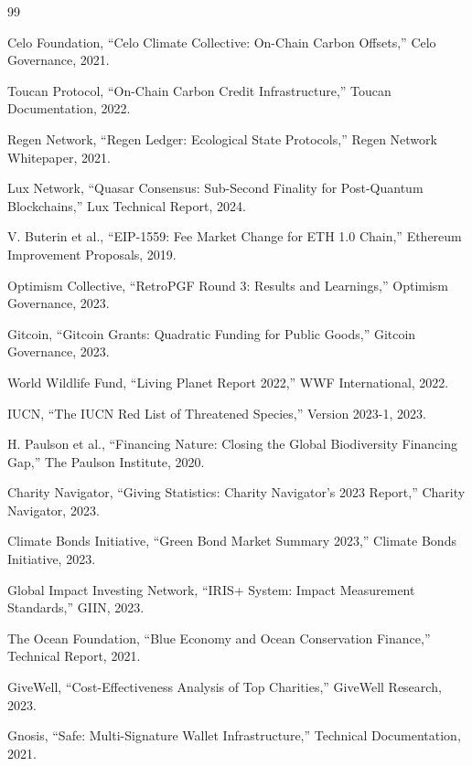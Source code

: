 \documentclass[11pt,letterpaper]{article}
\begin{document}

\begin{thebibliography}{99}

Celo Foundation, ``Celo Climate Collective: On-Chain Carbon Offsets,'' Celo Governance, 2021.

Toucan Protocol, ``On-Chain Carbon Credit Infrastructure,'' Toucan Documentation, 2022.

Regen Network, ``Regen Ledger: Ecological State Protocols,'' Regen Network Whitepaper, 2021.

Lux Network, ``Quasar Consensus: Sub-Second Finality for Post-Quantum Blockchains,'' Lux Technical Report, 2024.

V. Buterin et al., ``EIP-1559: Fee Market Change for ETH 1.0 Chain,'' Ethereum Improvement Proposals, 2019.

Optimism Collective, ``RetroPGF Round 3: Results and Learnings,'' Optimism Governance, 2023.

Gitcoin, ``Gitcoin Grants: Quadratic Funding for Public Goods,'' Gitcoin Governance, 2023.

World Wildlife Fund, ``Living Planet Report 2022,'' WWF International, 2022.

IUCN, ``The IUCN Red List of Threatened Species,'' Version 2023-1, 2023.

H. Paulson et al., ``Financing Nature: Closing the Global Biodiversity Financing Gap,'' The Paulson Institute, 2020.

Charity Navigator, ``Giving Statistics: Charity Navigator's 2023 Report,'' Charity Navigator, 2023.

Climate Bonds Initiative, ``Green Bond Market Summary 2023,'' Climate Bonds Initiative, 2023.

Global Impact Investing Network, ``IRIS+ System: Impact Measurement Standards,'' GIIN, 2023.

The Ocean Foundation, ``Blue Economy and Ocean Conservation Finance,'' Technical Report, 2021.

GiveWell, ``Cost-Effectiveness Analysis of Top Charities,'' GiveWell Research, 2023.

Gnosis, ``Safe: Multi-Signature Wallet Infrastructure,'' Technical Documentation, 2021.


\end{thebibliography}
\end{document}
